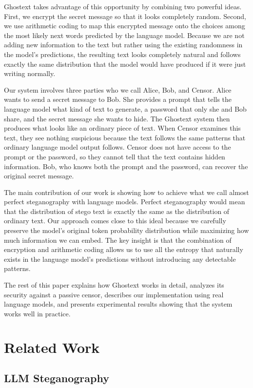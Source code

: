 \documentclass[sigconf,review,anonymous]{acmart}
\begin{document}
Ghostext takes advantage of this opportunity by combining two powerful ideas. First, we encrypt the secret message so that it looks completely random. Second, we use arithmetic coding to map this encrypted message onto the choices among the most likely next words predicted by the language model. Because we are not adding new information to the text but rather using the existing randomness in the model's predictions, the resulting text looks completely natural and follows exactly the same distribution that the model would have produced if it were just writing normally.

Our system involves three parties who we call Alice, Bob, and Censor. Alice wants to send a secret message to Bob. She provides a prompt that tells the language model what kind of text to generate, a password that only she and Bob share, and the secret message she wants to hide. The Ghostext system then produces what looks like an ordinary piece of text. When Censor examines this text, they see nothing suspicious because the text follows the same patterns that ordinary language model output follows. Censor does not have access to the prompt or the password, so they cannot tell that the text contains hidden information. Bob, who knows both the prompt and the password, can recover the original secret message.

The main contribution of our work is showing how to achieve what we call almost perfect steganography with language models. Perfect steganography would mean that the distribution of stego text is exactly the same as the distribution of ordinary text. Our approach comes close to this ideal because we carefully preserve the model's original token probability distribution while maximizing how much information we can embed. The key insight is that the combination of encryption and arithmetic coding allows us to use all the entropy that naturally exists in the language model's predictions without introducing any detectable patterns.

The rest of this paper explains how Ghostext works in detail, analyzes its security against a passive censor, describes our implementation using real language models, and presents experimental results showing that the system works well in practice.

\section{Related Work}

\subsection{LLM Steganography}
\end{document}
